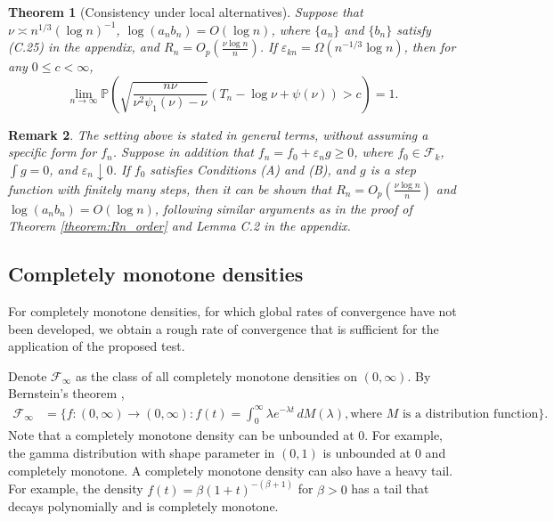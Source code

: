 \documentclass[12pt,letterpaper, twoside, openany]{article}
\theoremstyle{plain}
\newtheorem{theorem}{Theorem}[section]
\newtheorem{remark}[theorem]{Remark}
\begin{document}
\begin{theorem}[Consistency under local alternatives]\label{coro:k_monotone_H1_local_alt_rate}
    Suppose that $\nu \asymp n^{1/3}(\log n)^{-1}$, $\log (a_n b_n) = O(\log n)$, where $\{a_n\}$ and $\{b_n\}$ satisfy (C.25) in the appendix, and $R_n = O_p(\frac{\nu \log n}{n})$. If $\varepsilon_{kn} = \Omega(n^{-1/3} \log n)$, then for any $0 \leq c < \infty$,
    \begin{equation*}
\lim_{n \rightarrow \infty} \mathbb{P}     \left(
\sqrt{ \frac{n\nu}{\nu^2\psi_1(\nu)-\nu}} \left( T_n -  \log \nu +  \psi(\nu) \right) > c\right) = 1.
\end{equation*}
\end{theorem}
\begin{remark}
The setting above is stated in general terms, without assuming a specific form for $f_n$.
 Suppose in addition that $f_n = f_0 + \varepsilon_n g \geq 0$, where $f_0 \in \mathcal{F}_k$, $\int g = 0$, and $\varepsilon_n \downarrow 0$. If $f_0$ satisfies Conditions (A) and (B), and $g$ is a step function with finitely many steps, then it can be shown that $R_n = O_p\left(\frac{\nu \log n}{n}\right)$ and $\log(a_n b_n) = O(\log n)$, following similar arguments as in the proof of Theorem \ref{theorem:Rn_order} and Lemma C.2 in the appendix.
\end{remark}



\subsection{Completely monotone densities}\label{subsect:cm_log_density_ratio}
For completely monotone densities, for which global rates of convergence have not been developed, we obtain a rough rate of convergence that is sufficient for the application of the proposed test.

 Denote $\mathcal{F}_\infty$ as the class of all completely monotone densities on $(0, \infty)$. By  Bernstein's theorem \citep{feller1971introduction},
    \begin{align*}
        \mathcal{F}_\infty &= \bigg\{f:(0,\infty) \rightarrow (0,\infty) : f(t) = \int^\infty_0 \lambda e^{-\lambda t}\, dM(\lambda),  \text{where $M$ is a distribution function} \bigg\}.
    \end{align*}
Note that a completely monotone density can be unbounded at $0$. For example, the gamma distribution with shape parameter in $(0, 1)$ is unbounded at $0$ and completely monotone. A completely monotone density can also have a heavy tail. For example, the density $f(t) = \beta (1+t)^{-(\beta+1)}$ for $\beta > 0$ has a tail that decays polynomially and is completely monotone.
    
\end{document}

